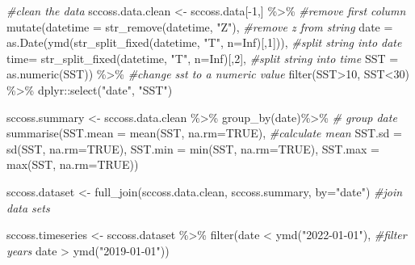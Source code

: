 \documentclass[]{tufte-handout}
\newenvironment{Shaded}{}{}
\newcommand{\AttributeTok}[1]{\textcolor[rgb]{0.49,0.56,0.16}{#1}}
\newcommand{\CommentTok}[1]{\textcolor[rgb]{0.38,0.63,0.69}{\textit{#1}}}
\newcommand{\ConstantTok}[1]{\textcolor[rgb]{0.53,0.00,0.00}{#1}}
\newcommand{\DecValTok}[1]{\textcolor[rgb]{0.25,0.63,0.44}{#1}}
\newcommand{\FunctionTok}[1]{\textcolor[rgb]{0.02,0.16,0.49}{#1}}
\newcommand{\NormalTok}[1]{#1}
\newcommand{\OtherTok}[1]{\textcolor[rgb]{0.00,0.44,0.13}{#1}}
\newcommand{\SpecialCharTok}[1]{\textcolor[rgb]{0.25,0.44,0.63}{#1}}
\newcommand{\StringTok}[1]{\textcolor[rgb]{0.25,0.44,0.63}{#1}}
\begin{document}
\begin{Shaded}
\begin{Highlighting}[]
\CommentTok{\#clean the data}
\NormalTok{sccoss.data.clean  }\OtherTok{\textless{}{-}}\NormalTok{ sccoss.data[}\SpecialCharTok{{-}}\DecValTok{1}\NormalTok{,] }\SpecialCharTok{\%\textgreater{}\%} \CommentTok{\#remove first column}
  \FunctionTok{mutate}\NormalTok{(}\AttributeTok{datetime =} \FunctionTok{str\_remove}\NormalTok{(datetime, }\StringTok{"Z"}\NormalTok{), }\CommentTok{\#remove z from string}
         \AttributeTok{date =} \FunctionTok{as.Date}\NormalTok{(}\FunctionTok{ymd}\NormalTok{(}\FunctionTok{str\_split\_fixed}\NormalTok{(datetime, }\StringTok{"T"}\NormalTok{, }\AttributeTok{n=}\ConstantTok{Inf}\NormalTok{)[,}\DecValTok{1}\NormalTok{])), }\CommentTok{\#split string into date}
         \AttributeTok{time=} \FunctionTok{str\_split\_fixed}\NormalTok{(datetime, }\StringTok{"T"}\NormalTok{, }\AttributeTok{n=}\ConstantTok{Inf}\NormalTok{)[,}\DecValTok{2}\NormalTok{], }\CommentTok{\#split string into time}
         \AttributeTok{SST =} \FunctionTok{as.numeric}\NormalTok{(SST)) }\SpecialCharTok{\%\textgreater{}\%} \CommentTok{\#change sst to a numeric value}
  \FunctionTok{filter}\NormalTok{(SST}\SpecialCharTok{\textgreater{}}\DecValTok{10}\NormalTok{,}
\NormalTok{         SST}\SpecialCharTok{\textless{}}\DecValTok{30}\NormalTok{) }\SpecialCharTok{\%\textgreater{}\%}
\NormalTok{  dplyr}\SpecialCharTok{::}\FunctionTok{select}\NormalTok{(}\StringTok{"date"}\NormalTok{, }\StringTok{"SST"}\NormalTok{) }

\NormalTok{sccoss.summary }\OtherTok{\textless{}{-}}\NormalTok{ sccoss.data.clean }\SpecialCharTok{\%\textgreater{}\%} 
  \FunctionTok{group\_by}\NormalTok{(date)}\SpecialCharTok{\%\textgreater{}\%} \CommentTok{\# group date}
  \FunctionTok{summarise}\NormalTok{(}\AttributeTok{SST.mean =} \FunctionTok{mean}\NormalTok{(SST, }\AttributeTok{na.rm=}\ConstantTok{TRUE}\NormalTok{), }\CommentTok{\#calculate mean}
            \AttributeTok{SST.sd =} \FunctionTok{sd}\NormalTok{(SST, }\AttributeTok{na.rm=}\ConstantTok{TRUE}\NormalTok{),}
            \AttributeTok{SST.min =} \FunctionTok{min}\NormalTok{(SST, }\AttributeTok{na.rm=}\ConstantTok{TRUE}\NormalTok{),}
            \AttributeTok{SST.max =} \FunctionTok{max}\NormalTok{(SST, }\AttributeTok{na.rm=}\ConstantTok{TRUE}\NormalTok{))}

\NormalTok{sccoss.dataset }\OtherTok{\textless{}{-}} \FunctionTok{full\_join}\NormalTok{(sccoss.data.clean, sccoss.summary, }\AttributeTok{by=}\StringTok{"date"}\NormalTok{) }\CommentTok{\#join data sets}

\NormalTok{sccoss.timeseries }\OtherTok{\textless{}{-}}\NormalTok{ sccoss.dataset }\SpecialCharTok{\%\textgreater{}\%} 
  \FunctionTok{filter}\NormalTok{(date }\SpecialCharTok{\textless{}} \FunctionTok{ymd}\NormalTok{(}\StringTok{"2022{-}01{-}01"}\NormalTok{), }\CommentTok{\#filter years}
\NormalTok{         date }\SpecialCharTok{\textgreater{}} \FunctionTok{ymd}\NormalTok{(}\StringTok{"2019{-}01{-}01"}\NormalTok{))}
\end{Highlighting}
\end{Shaded}
\end{document}
